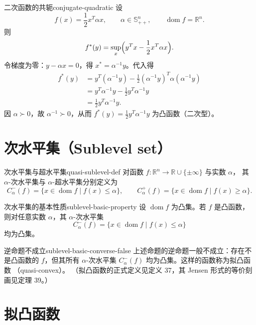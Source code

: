 \documentclass[11pt,a4paper]{article}
\newcommand{\sublevel}[2]{C_{#2}^{-}(#1)}
\newcommand{\suplevel}[2]{C_{#2}^{+}(#1)}
\begin{document}
\begin{example}{二次函数的共轭}{conjugate-quadratic}
设
\[
f(x)=\frac12 x^T\alpha x,\qquad
\alpha\in\mathbb{S}_{++}^n,\qquad
\operatorname{dom}f=\mathbb{R}^n.
\]
则
\[
f^*(y)=\sup_x\Bigl(y^Tx-\frac12 x^T\alpha x\Bigr).
\]
令梯度为零：$y-\alpha x=0$，得 $x^*=\alpha^{-1}y$。代入得
\[
\begin{aligned}
f^*(y)
&=y^T(\alpha^{-1}y)-\frac12(\alpha^{-1}y)^T\alpha(\alpha^{-1}y)\\
&=y^T\alpha^{-1}y-\frac12 y^T\alpha^{-1}y\\
&=\frac12 y^T\alpha^{-1}y.
\end{aligned}
\]
因 $\alpha\succ0$，故 $\alpha^{-1}\succ0$，从而 $f^*(y)=\frac12 y^T\alpha^{-1}y$ 为凸函数（二次型）。
\end{example}

\section{次水平集（Sublevel set）}\label{sec:ch3-sublevel}

\begin{definition}{次水平集与超水平集}{quasi-sublevel-def}
对函数 $f:\mathbb{R}^n\to\mathbb{R}\cup\{\pm\infty\}$ 与实数 $\alpha$，
其 $\alpha$-\textup{次水平集}与 $\alpha$-\textup{超水平集}分别定义为
\[
\sublevel{f}{\alpha}
=
\{x\in\operatorname{dom}f\mid f(x)\le \alpha\},
\qquad
\suplevel{f}{\alpha}
=
\{x\in\operatorname{dom}f\mid f(x)\ge \alpha\}.
\]
\end{definition}

\begin{theorem}{次水平集的基本性质}{sublevel-basic-property}
设 $\operatorname{dom}f$ 为凸集。若 $f$ 是凸函数，则对任意实数 $\alpha$，其
$\alpha$-次水平集
\[
\sublevel{f}{\alpha}
=
\{x\in \operatorname{dom}f\mid f(x)\le \alpha\}
\]
均为凸集。
\end{theorem}

\begin{remark}{逆命题不成立}{sublevel-basic-converse-false}
上述命题的逆命题一般不成立：存在不是凸函数的 $f$，但其所有
$\alpha$-次水平集 $\sublevel{f}{\alpha}$ 均为凸集。这样的函数称为拟凸函数
（quasi-convex）。
（拟凸函数的正式定义见定义 37，其 Jensen 形式的等价刻画见定理 39。）
\end{remark}

\section{拟凸函数}\label{sec:ch3-quasiconvex}
\end{document}
